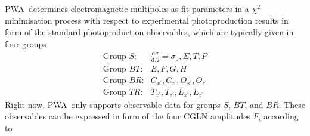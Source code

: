 \documentclass[a4paper,10pt]{article}
\def\PWA{\ttfamily PWA\rmfamily\ }
\def\d{\mathrm{d}}
\begin{document}
\PWA determines electromagnetic multipoles as fit parameters in a $\chi^2$ minimisation process with respect to
experimental photoproduction results in form of the standard photoproduction observables, which are typically
given in four groups
\begin{displaymath}
\begin{array}{ll}
 \mbox{Group $S$:} &\frac{\d\sigma}{\d\Omega} = \sigma_0, \Sigma, T, P\\
 \mbox{Group $BT$:}& E, F, G, H\\
 \mbox{Group $BR$:}& C_{x^\prime}, C_{z^\prime}, O_{x^\prime}, O_{z^\prime}\\
 \mbox{Group $TR$:}& T_{x^\prime}, T_{z^\prime}, L_{x^\prime}, L_{z^\prime}
\end{array}
\end{displaymath}
Right now, \PWA only supports observable data for groups $S$, $BT$, and $BR$. These observables can be expressed
in form of the four CGLN amplitudes $F_i$ according to
\end{document}
